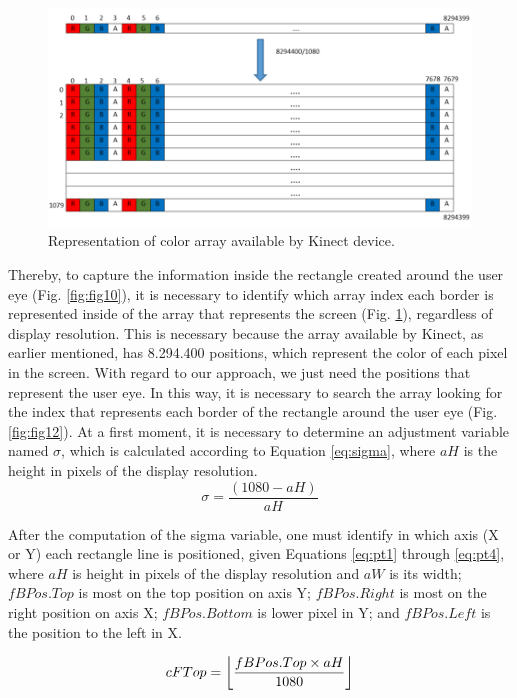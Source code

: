 \documentclass[10pt, conference]{IEEEtran}
\DeclarePairedDelimiter\floor{\lfloor}{\rfloor}
\begin{document}
  \begin{figure}[t]
      \centering
      \includegraphics{figures/pic11.png}
      \caption{Representation of color array available by Kinect device.}
      \label{fig:fig11}
  \end{figure}

	Thereby, to capture the information inside the rectangle created around the user eye (Fig. \ref{fig:fig10}), it is necessary to identify which array index each border is represented inside of the array that represents the screen (Fig. \ref{fig:fig11}), regardless of display resolution. 
	This is necessary because the array available by Kinect, as earlier mentioned, has 8.294.400 positions, which represent the color of each pixel in the screen. With regard to our approach, we just need the positions that represent the user eye. 
	In this way, it is necessary to search the array looking for the index that represents each border of the rectangle around the user eye (Fig. \ref{fig:fig12}). 
	At a first moment, it is necessary to determine an adjustment variable named $\sigma$, which is calculated according to Equation \ref{eq:sigma}, where $aH$ is the height in pixels of the display resolution.
    \begin{equation}
    	\sigma = \frac{(1080 - aH)}{aH}
		\label{eq:sigma}
	\end{equation}
    
	After the computation of the sigma variable, one must identify in which axis (X or Y) each rectangle line is positioned, given Equations \ref{eq:pt1} through \ref{eq:pt4}, where $aH$ is height in pixels of the display resolution and $aW$ is its width; $fBPos.Top$ is most on the top position on axis Y; $fBPos.Right$ is most on the right position on axis X; $fBPos.Bottom$ is lower pixel in Y; and $fBPos.Left$ is the position to the left in X.
    
	\begin{equation}
		cFTop = \floor*{\frac{fBPos.Top \times aH}{1080}}
        \label{eq:pt1}
	\end{equation}
    
\end{document}
